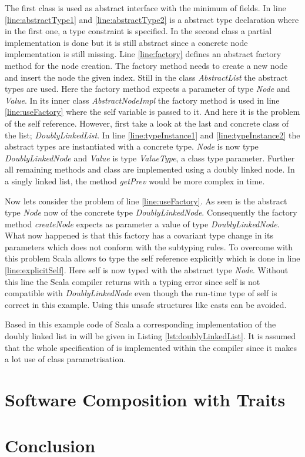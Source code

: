 The first class is used as abstract interface with the minimum of fields.
In line \ref{line:abstractType1} and \ref{line:abstractType2} is a
abstract type declaration where in the first one, a type constraint is
specified.  In the second class a partial implementation is done but it is
still abstract since a concrete node implementation is still missing. Line
\ref{line:factory} defines an abstract factory method for the node
creation. The factory method needs to create a new node and insert the
node the given index. Still in the class \emph{AbstractList} the abstract
types are used. Here the factory method expects a parameter of type
\emph{Node} and \emph{Value}. In its inner class \emph{AbstractNodeImpl}
the factory method is used in line \ref{line:useFactory} where the
self variable is passed to it. And here it is the problem of the self
reference. However, first take a look at the last and concrete class
of the list; \emph{DoublyLinkedList}. In line \ref{line:typeInstance1}
and \ref{line:typeInstance2} the abstract types are instantiated with
a concrete type. \emph{Node} is now type \emph{DoublyLinkedNode} and
\emph{Value} is type \emph{ValueType}, a class type parameter. Further all
remaining methods and class are implemented using a doubly linked node.
In a singly linked list, the method \emph{getPrev} would be more complex
in time.

Now lets consider the problem of line \ref{line:useFactory}. As
seen is the abstract type \emph{Node} now of the concrete
type \emph{DoublyLinkedNode}.  Consequently the factory
method \emph{createNode} expects as parameter a value of type
\emph{DoublyLinkedNode}. What now happened is that this factory has a
covariant type change in its parameters which does not conform with the
subtyping rules. To overcome with this problem Scala allows to type the
self reference explicitly which is done in line \ref{line:explicitSelf}.
Here self is now typed with the abstract type \emph{Node}. Without this
line the Scala compiler returns with a typing error since self is not
compatible with \emph{DoublyLinkedNode} even though the run-time
type of self is correct in this example. Using this unsafe structures
like casts can be avoided.



Based in this example code of Scala a corresponding implementation
of the doubly linked list in \ooplss will be given in Listing
\ref{lst:doublyLinkedList}. It is assumed that the whole specification
of \ooplss is implemented within the compiler since it makes a lot
use of class parametrisation.



\section{Software Composition with Traits}

\section{Conclusion}
